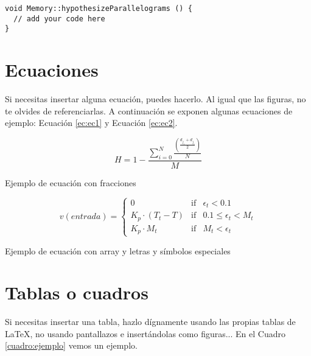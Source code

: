 \begin{verbatim}
void Memory::hypothesizeParallelograms () {
  // add your code here
}
\end{verbatim}

\section{Ecuaciones}

Si necesitas insertar alguna ecuación, puedes hacerlo. Al igual que las figuras, no te olvides de referenciarlas. A continuación se exponen algunas ecuaciones de ejemplo: Ecuación \ref{ec:ec1} y Ecuación \ref{ec:ec2}.

\begin{myequation}[h]
	\begin{equation}
		H = 1 - \frac{\sum_{i=0}^{N}\frac{(\frac{d_{j_s} + d_{j_e}}{2})}{N}}{M}
		\nonumber
		\label{ec:ec1}
	\end{equation}
	\caption[Ejemplo de ecuación con fracciones]{Ejemplo de ecuación con fracciones}
\end{myequation}

\begin{myequation}[h]
	\begin{equation}
		v(entrada)= \left\{
		\begin{array}{lcc}
			0                   & \mbox{if} & \epsilon_t < 0.1          \\
			K_p\cdot{(T_{t}-T)} & \mbox{if} & 0.1 \leq \epsilon_t < M_t \\
			K_p \cdot M_t       & \mbox{if} & M_t < \epsilon_t
		\end{array}
		\right.
		\label{ec:ec2}
	\end{equation}
	\caption[Ejemplo de ecuación con array y letras y símbolos especiales]{Ejemplo de ecuación con array y letras y símbolos especiales}
\end{myequation}

\section{Tablas o cuadros}

Si necesitas insertar una tabla, hazlo dígnamente usando las propias tablas de \LaTeX, no usando pantallazos e insertándolas como figuras... En el Cuadro \ref{cuadro:ejemplo} vemos un ejemplo.

